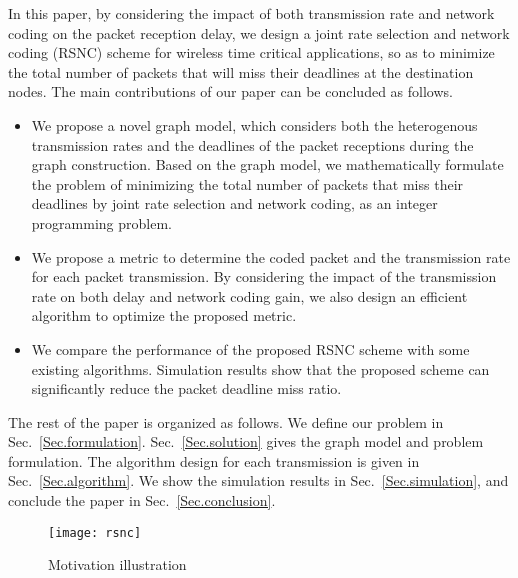 \documentclass[journal]{IEEEtran}
\begin{document}
In this paper, by considering the impact of both transmission rate and network coding on the packet reception delay, we design a joint rate selection and network coding (RSNC) scheme for wireless time critical applications, so as to minimize the total number of packets that will miss their deadlines at the destination nodes. The main contributions of our paper can be concluded as follows.
\begin{itemize}
\item We propose a novel graph model, which considers both the heterogenous transmission rates and the deadlines of the packet receptions during the graph construction. Based on the graph model, we mathematically formulate the problem of minimizing the total number of packets that miss their deadlines by joint rate selection and network coding, as an integer programming problem.
\item We propose a metric to determine the coded packet and the transmission rate for each packet transmission. By considering the impact of the transmission rate on both delay and network coding gain, we also design an efficient algorithm to optimize the proposed metric.



\item We compare the performance of the proposed RSNC scheme with some existing algorithms. Simulation results show that the proposed scheme can significantly reduce the packet deadline miss ratio.
\end{itemize}

The rest of the paper is organized as follows. We define our problem in Sec.~\ref{Sec.formulation}. Sec.~\ref{Sec.solution} gives the graph model and problem formulation. The algorithm design for each transmission is given in Sec.~\ref{Sec.algorithm}. We show the simulation results in Sec.~\ref{Sec.simulation}, and conclude the paper in Sec.~\ref{Sec.conclusion}.

\begin{figure}[t]
\begin{center}\vspace{-0.04in}
\texttt{[image: rsnc]}\vspace{-0.1in}
\caption{Motivation illustration}\vspace{-0.08in} \label{Fig.rsnc}
\end{center}\vspace{-0.15in}
\end{figure}

\vspace{-0.1in}
\end{document}
